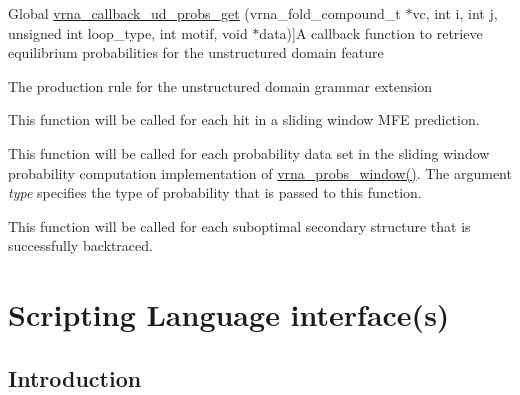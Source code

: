 \begin{DoxyRefList}
%
Global \hyperlink{group__domains__up_gaa10ba1b6f1e179ea84c5caca9cdaae67}{vrna\+\_\+callback\+\_\+ud\+\_\+probs\+\_\+get} (vrna\+\_\+fold\+\_\+compound\+\_\+t $\ast$vc, int i, int j, unsigned int loop\+\_\+type, int motif, void $\ast$data)]A callback function to retrieve equilibrium probabilities for the unstructured domain feature  
\item[\label{callbacks__callbacks000012}%
\Hypertarget{callbacks__callbacks000012}%
Global \hyperlink{group__domains__up_ga4fdfc02c1b660c07f2d887772f02a0a1}{vrna\+\_\+callback\+\_\+ud\+\_\+production} (vrna\+\_\+fold\+\_\+compound\+\_\+t $\ast$vc, void $\ast$data)]The production rule for the unstructured domain grammar extension  
\item[\label{callbacks__callbacks000008}%
\Hypertarget{callbacks__callbacks000008}%
Global \hyperlink{group__mfe__fold_ga4f3e5bc214ef803074ace313cb9571b4}{vrna\+\_\+mfe\+\_\+window\+\_\+callback} (int start, int end, const char $\ast$structure, float en, void $\ast$data)]This function will be called for each hit in a sliding window M\+FE prediction.  
\item[\label{callbacks__callbacks000007}%
\Hypertarget{callbacks__callbacks000007}%
Global \hyperlink{LPfold_8h_abe710a1182e6db69cc75329dfc9bed67}{vrna\+\_\+probs\+\_\+window\+\_\+callback} (F\+L\+T\+\_\+\+O\+R\+\_\+\+D\+BL $\ast$pr, int pr\+\_\+size, int i, int max, unsigned int type, void $\ast$data)]This function will be called for each probability data set in the sliding window probability computation implementation of \hyperlink{group__local__pf__fold_ga70ec33810fa17a9f67a7c59f156d0137}{vrna\+\_\+probs\+\_\+window()}. The argument {\itshape type} specifies the type of probability that is passed to this function.  
\item[\label{callbacks__callbacks000009}%
\Hypertarget{callbacks__callbacks000009}%
Global \hyperlink{group__subopt__wuchty_gaa0270c66d04f59e750401695b8282e04}{vrna\+\_\+subopt\+\_\+callback} (const char $\ast$stucture, float energy, void $\ast$data)]This function will be called for each suboptimal secondary structure that is successfully backtraced. 
\end{DoxyRefList}\hypertarget{wrappers}{}\section{Scripting Language interface(s)}\label{wrappers}
\hypertarget{wrappers_scripting_intro}{}\subsection{Introduction}\label{wrappers_scripting_intro}
